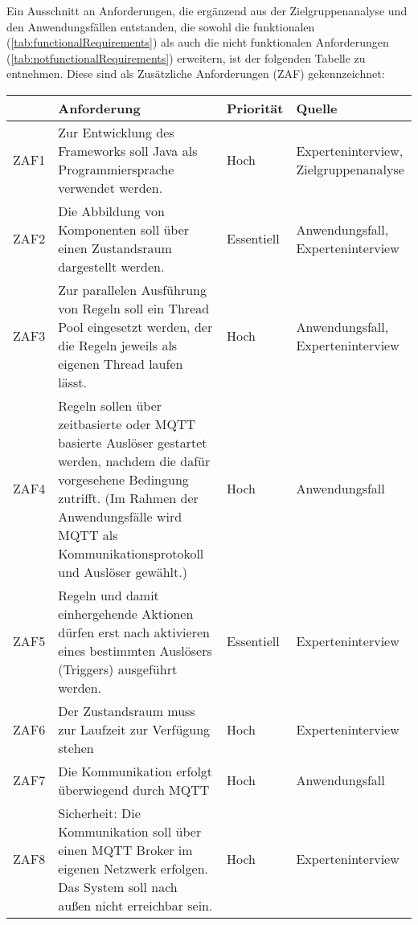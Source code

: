 \subsubsection*{}
Ein Ausschnitt an Anforderungen, die ergänzend aus der Zielgruppenanalyse und den Anwendungsfällen entstanden, die sowohl die funktionalen 
(\ref{tab:functionalRequirements}) als auch die nicht funktionalen Anforderungen (\ref{tab:notfunctionalRequirements}) erweitern, ist der folgenden 
Tabelle zu entnehmen. Diese sind als Zusätzliche Anforderungen (ZAF) gekennzeichnet: 
\begin{table}[hbt!]
    \begin{center}
        \begin{tabular}{ | p{1.0cm} | p{9.2cm} | p{1.6cm} | p{3.1cm} | }
            \hline
                \textbf{} & \textbf{Anforderung} & \textbf{Priorität} & \textbf{Quelle} \\
            \hline
                ZAF1 & Zur Entwicklung des Frameworks soll Java als Programmiersprache verwendet werden. & Hoch & Experteninterview, Zielgruppenanalyse \\ 
            \hline
                ZAF2 & Die Abbildung von Komponenten soll über einen Zustandsraum dargestellt werden. & Essentiell & Anwendungsfall, Experteninterview \\ 
            \hline
                ZAF3 & Zur parallelen Ausführung von Regeln soll ein Thread Pool eingesetzt werden, der die Regeln jeweils als eigenen Thread laufen lässt. & Hoch & Anwendungsfall, Experteninterview \\ 
            \hline
                ZAF4 & Regeln sollen über zeitbasierte oder MQTT basierte Auslöser gestartet werden, nachdem die dafür vorgesehene Bedingung zutrifft. (Im Rahmen der Anwendungsfälle wird MQTT als Kommunikationsprotokoll und Auslöser gewählt.) & Hoch & Anwendungsfall \\
            \hline
                ZAF5 & Regeln und damit einhergehende Aktionen dürfen erst nach aktivieren eines bestimmten Auslösers (Triggers) ausgeführt werden. & Essentiell & Experteninterview \\
            \hline
                ZAF6 & Der Zustandsraum muss zur Laufzeit zur Verfügung stehen & Hoch & Experteninterview \\ 
            \hline
                ZAF7 & Die Kommunikation erfolgt überwiegend durch MQTT & Hoch & Anwendungsfall \\ 
            \hline
                ZAF8 & Sicherheit: Die Kommunikation soll über einen MQTT Broker im eigenen Netzwerk erfolgen. Das System soll nach außen nicht erreichbar sein. & Hoch & Experteninterview \\

\end{tabular}
\end{center}
\end{table}
